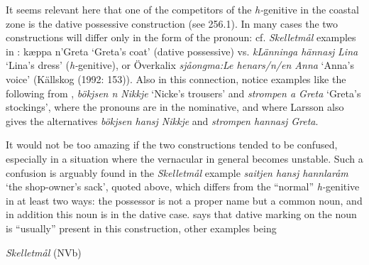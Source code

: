 \begin{styleBodytextC}
It seems relevant here that one of the competitors of the \textit{h-}genitive in the coastal zone is the dative possessive construction (see 256.1). In many cases the two constructions will differ only in the form of the pronoun: cf. \textit{Skelletmål} examples in \citet{Marklund1976}: kæppa n’Greta ‘Greta’s coat’ (dative possessive) vs. \textit{kLänninga hännasj} \textit{Lina} ‘Lina’s dress’ (\textit{h-}genitive), or Överkalix \textit{sjåongma:Le henars/n/en Anna} ‘Anna’s voice’ (Källskog (1992: 153)). Also in this connection, notice examples like the following from \citet[125]{Larsson1929}, \textit{bökjsen n Nikkje }‘Nicke’s trousers’ and \textit{strompen a Greta} ‘Greta’s stockings’, where the pronouns are in the nominative, and where Larsson also gives the alternatives \textit{bökjsen hansj Nikkje} and \textit{strompen hannasj Greta}.

\end{styleBodytextC}

\begin{styleBodytextC}
It would not be too amazing if the two constructions tended to be confused, especially in a situation where the vernacular in general becomes unstable. Such a confusion is arguably found in the \textit{Skelletmål} example \textit{saitjen hansj hannlaråm }‘the shop-owner’s sack’, quoted above, which differs from the “normal” \textit{h-}genitive in at least two ways: the possessor is not a proper name but a common noun, and in addition this noun is in the dative case. \citet[23]{Marklund1976} says that dative marking on the noun is “usually” present in this construction, other examples being 

\end{styleBodytextC}

\begin{listWWNumileveli}
\item {}

\begin{styleExample}
\label{bkm:Ref136428236}\textit{Skelletmål} (NVb)

\end{styleExample}

\end{listWWNumileveli}

\begin{listWWNumlxxxiileveli}
\item {}

\end{listWWNumlxxxiileveli}

